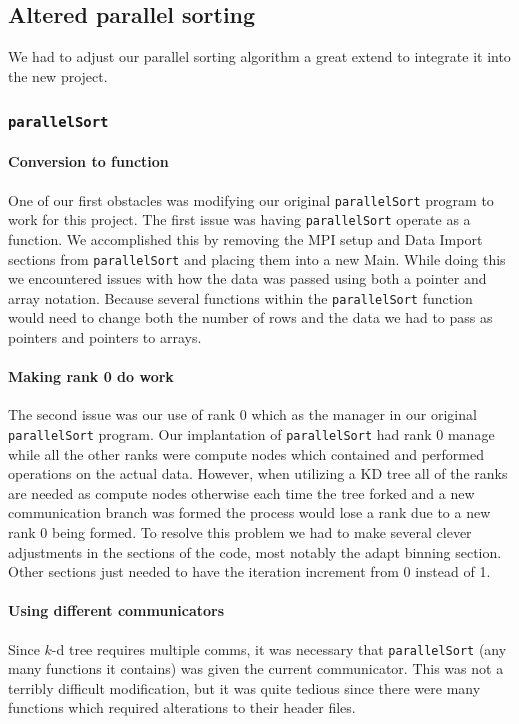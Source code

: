\documentclass{article}
\begin{document}
\subsection{Altered parallel sorting}
We had to adjust our parallel sorting algorithm a great extend to integrate it into the new project.


\subsubsection{\texttt{parallelSort}}


\paragraph{Conversion to function}
One of our first obstacles was modifying our original \texttt{parallelSort}  program to work for this project. The first issue was having \texttt{parallelSort} operate as a function. We accomplished this by removing the MPI setup and Data Import sections from \texttt{parallelSort} and placing them into a new Main. While doing this we encountered issues with how the data was passed using both a pointer and array notation. Because several functions within the \texttt{parallelSort} function would need to change both the number of rows and the data we had to pass as pointers and pointers to arrays. 


\paragraph{Making rank 0 do work}
The second issue was our use of rank 0 which as the manager in our original \texttt{parallelSort} program. Our implantation of \texttt{parallelSort} had rank 0 manage while all the other ranks were compute nodes which contained and performed operations on the actual data. However, when utilizing a KD tree all of the ranks are needed as compute nodes otherwise each time the tree forked and a new communication branch was formed the process would lose a rank due to a new rank 0 being formed. To resolve this problem we had to make several clever adjustments in the sections of the code, most notably the adapt binning section. Other sections just needed to have the iteration increment from 0 instead of 1.

\paragraph{Using different communicators}
Since $k$-d tree requires multiple comms, it was necessary that \texttt{parallelSort} (any many functions it contains) was given the current communicator. This was not a terribly difficult modification, but it was quite tedious since there were many functions which required alterations to their header files.
\end{document}
